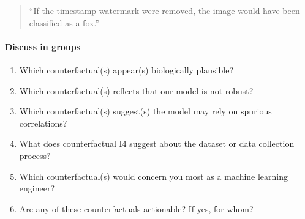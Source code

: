 \documentclass[11pt]{article}
\begin{document}
\begin{quote}
	``If the timestamp watermark were removed, the image would have been classified as a fox.''
\end{quote}

\paragraph{Discuss in groups}

\begin{enumerate}[label=\arabic*.]
	
	\item Which counterfactual(s) appear(s) biologically plausible?
	
	\item Which counterfactual(s) reflects that our model is not robust?
	
	\item Which counterfactual(s) suggest(s) the model may rely on spurious correlations?
	
	\item What does counterfactual I4 suggest about the dataset or data collection process?
	
	\item Which counterfactual(s) would concern you most as a machine learning engineer?
	
	\item Are any of these counterfactuals actionable? If yes, for whom?

\end{enumerate}
\end{document}
